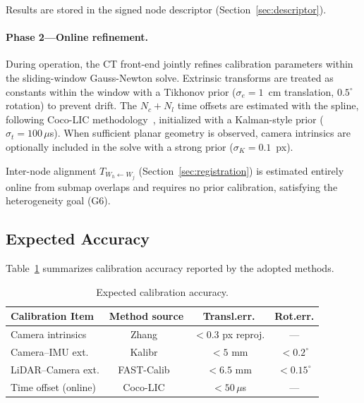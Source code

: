 Results are stored in the signed node descriptor (Section~\ref{sec:descriptor}).

\paragraph{Phase 2---Online refinement.} During operation, the CT front-end
jointly refines calibration parameters within the sliding-window Gauss-Newton
solve. Extrinsic transforms are treated as constants within the window with a
Tikhonov prior ($\sigma_e=1$~cm translation, $0.5^\circ$ rotation) to prevent
drift. The $N_c+N_l$ time offsets are estimated with the spline, following
Coco-LIC methodology~\cite{lang2023coco_mob}, initialized with a
Kalman-style prior ($\sigma_t=100\,\mu$s). When sufficient planar geometry is
observed, camera intrinsics are optionally included in the solve with a
strong prior ($\sigma_K=0.1$~px).

Inter-node alignment $T_{W_h\leftarrow W_j}$ (Section~\ref{sec:registration})
is estimated entirely online from submap overlaps and requires no prior
calibration, satisfying the heterogeneity goal (G6).

\subsection{Expected Accuracy}

Table~\ref{tab:calib_results} summarizes calibration accuracy reported by
the adopted methods.

\begin{table}[t]
  \centering
  \caption{Expected calibration accuracy.}
  \label{tab:calib_results}
  \footnotesize
  \setlength{\tabcolsep}{4pt}
  \begin{tabular}{lccc}
    \toprule
    Calibration Item & Method source & Transl.\@ err.\@ & Rot.\@ err.\@ \\
    \midrule
    Camera intrinsics     & Zhang~\cite{zhang2000flexible}    & $<0.3$ px reproj.\@& --- \\
    Camera--IMU ext.\@   & Kalibr~\cite{rehder2016kalibr}    & $<5$ mm  & $<0.2^\circ$ \\
    LiDAR--Camera ext.\@ & FAST-Calib~\cite{zheng2026fastcalib} & $<6.5$ mm & $<0.15^\circ$ \\
    Time offset (online) & Coco-LIC~\cite{lang2023coco_mob}  & $<50\,\mu$s & --- \\
    \bottomrule
  \end{tabular}
\end{table}

